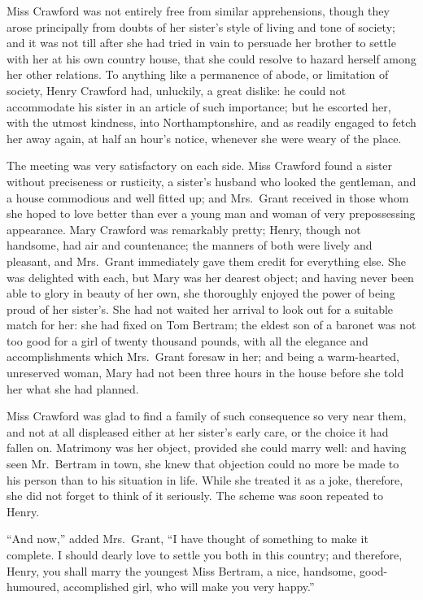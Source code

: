 \documentclass{article}
\begin{document}
Miss Crawford was not entirely free from similar
apprehensions, though they arose principally from doubts
of her sister's style of living and tone of society;
and it was not till after she had tried in vain to persuade
her brother to settle with her at his own country house,
that she could resolve to hazard herself among her
other relations.  To anything like a permanence of abode,
or limitation of society, Henry Crawford had, unluckily,
a great dislike:  he could not accommodate his sister
in an article of such importance; but he escorted her,
with the utmost kindness, into Northamptonshire,
and as readily engaged to fetch her away again, at half
an hour's notice, whenever she were weary of the place.

The meeting was very satisfactory on each side.
Miss Crawford found a sister without preciseness
or rusticity, a sister's husband who looked the gentleman,
and a house commodious and well fitted up; and Mrs.\ Grant
received in those whom she hoped to love better than ever
a young man and woman of very prepossessing appearance.
Mary Crawford was remarkably pretty; Henry, though not handsome,
had air and countenance; the manners of both were lively
and pleasant, and Mrs.\ Grant immediately gave them credit
for everything else.  She was delighted with each,
but Mary was her dearest object; and having never been
able to glory in beauty of her own, she thoroughly enjoyed
the power of being proud of her sister's. She had not waited
her arrival to look out for a suitable match for her:
she had fixed on Tom Bertram; the eldest son of a baronet
was not too good for a girl of twenty thousand pounds,
with all the elegance and accomplishments which Mrs.\ Grant
foresaw in her; and being a warm-hearted, unreserved woman,
Mary had not been three hours in the house before she
told her what she had planned.

Miss Crawford was glad to find a family of such consequence
so very near them, and not at all displeased either at
her sister's early care, or the choice it had fallen on.
Matrimony was her object, provided she could marry well:
and having seen Mr.\ Bertram in town, she knew that
objection could no more be made to his person than to
his situation in life.  While she treated it as a joke,
therefore, she did not forget to think of it seriously.
The scheme was soon repeated to Henry.

``And now,'' added Mrs.\ Grant, ``I have thought of something
to make it complete.  I should dearly love to settle you
both in this country; and therefore, Henry, you shall
marry the youngest Miss Bertram, a nice, handsome,
good-humoured, accomplished girl, who will make you very happy.''
\end{document}
